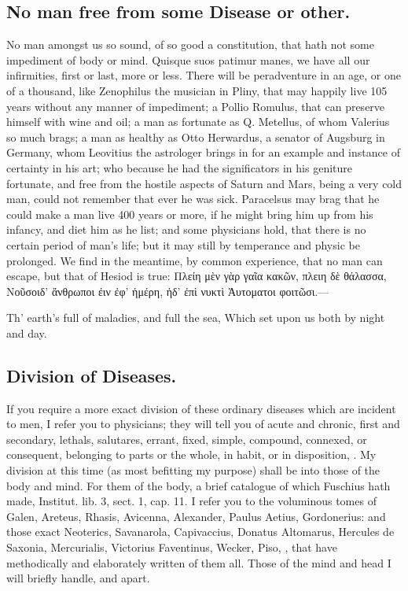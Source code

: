{\subsection{No man free from some Disease or other.}
No man amongst us so sound,
of so good a constitution, that hath not some impediment of body or
mind. Quisque suos patimur manes, we have all our infirmities, first or
last, more or less. There will be peradventure in an age, or one of a
thousand, like Zenophilus the musician in Pliny, that may happily
live 105 years without any manner of impediment; a Pollio Romulus, that
can preserve himself with wine and oil; a man as fortunate as Q.
Metellus, of whom Valerius so much brags; a man as healthy as Otto
Herwardus, a senator of Augsburg in Germany, whom Leovitius the
astrologer brings in for an example and instance of certainty in his
art; who because he had the significators in his geniture fortunate,
and free from the hostile aspects of Saturn and Mars, being a very cold
man, could not remember that ever he was sick. Paracelsus may
brag that he could make a man live 400 years or more, if he might bring
him up from his infancy, and diet him as he list; and some physicians
hold, that there is no certain period of man's life; but it may still
by temperance and physic be prolonged. We find in the meantime, by
common experience, that no man can escape, but that of Hesiod is
true:
Πλείη μὲν γὰρ γαῖα κακῶν, πλειη δὲ θάλασσα,
Νοῦσοιδ' ἄνθρωποι ἐιν ἐφ' ἡμέρη, ἠδ' ἐπὶ νυκτὶ
Ἁυτοματοι φοιτῶσι.---

Th' earth's full of maladies, and full the sea,
Which set upon us both by night and day.

\subsection{Division of Diseases.}
If you require a more exact division of these
ordinary diseases which are incident to men, I refer you to physicians;
they will tell you of acute and chronic, first and secondary,
lethals, salutares, errant, fixed, simple, compound, connexed, or
consequent, belonging to parts or the whole, in habit, or in
disposition, \etc{}. My division at this time (as most befitting my
purpose) shall be into those of the body and mind. For them of the
body, a brief catalogue of which Fuschius hath made, Institut. lib. 3,
sect. 1, cap. 11. I refer you to the voluminous tomes of Galen,
Areteus, Rhasis, Avicenna, Alexander, Paulus Aetius, Gordonerius: and
those exact Neoterics, Savanarola, Capivaccius, Donatus Altomarus,
Hercules de Saxonia, Mercurialis, Victorius Faventinus, Wecker, Piso,
\etc{}, that have methodically and elaborately written of them all. Those
of the mind and head I will briefly handle, and apart.

}
